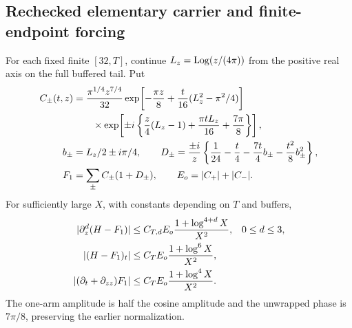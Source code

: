 \subsection{Rechecked elementary carrier and finite-endpoint forcing}
\begin{proposition}
\label{prop:elementary-compact}
For each fixed finite $[32,T]$, continue $L_z=\operatorname{Log}(z/(4\pi))$
from the positive real axis on the full buffered tail. Put
\begin{align}
 C_\pm(t,z)&=\frac{\pi^{1/4}z^{7/4}}{32}
 \exp\!\left[-\frac{\pi z}{8}
       +\frac t{16}(L_z^2-\pi^2/4)\right]\notag\\
 &\qquad\times\exp\!\left[\pm i\left\{
    \frac z4(L_z-1)+\frac{\pi tL_z}{16}+\frac{7\pi}{8}\right\}\right],\notag\\
 b_\pm&=L_z/2\pm i\pi/4,\qquad
 D_\pm=\frac{\pm i}{z}
       \left\{\frac1{24}-\frac t4-\frac{7t}4b_\pm
                                      -\frac{t^2}8b_\pm^2\right\},\notag\\
 F_1&=\sum_\pm C_\pm(1+D_\pm),\qquad
 E_o=|C_+|+|C_-|.
 \label{eq:compact-elementary-model}
\end{align}
For sufficiently large $X$, with constants depending on $T$ and buffers,
\begin{align}
 |\partial_z^d(H-F_1)|&\le C_{T,d}E_o
                     \frac{1+\log^{4+d}X}{X^2},&&0\le d\le3,\notag\\
 |(H-F_1)_t|&\le C_TE_o\frac{1+\log^6X}{X^2},\notag\\
 |(\partial_t+\partial_{zz})F_1|&\le C_TE_o
                                     \frac{1+\log^4X}{X^2}.
 \label{eq:compact-elementary-error}
\end{align}
The one-arm amplitude is half the cosine amplitude and the unwrapped
phase is $7\pi/8$, preserving the earlier normalization.
\end{proposition}
